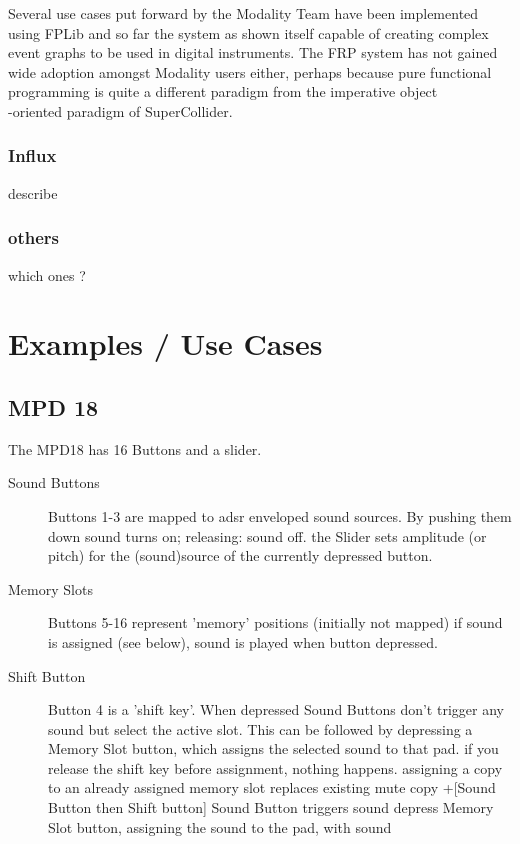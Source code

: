 \documentclass{article}
\begin{document}
Several use cases put forward by the Modality Team have been implemented using FPLib and so far the system as shown itself capable of creating complex event graphs to be used in digital instruments. The FRP system has not gained wide adoption amongst Modality users either, perhaps because pure functional programming is quite a different paradigm from the imperative object\\-oriented paradigm of SuperCollider.

\subsubsection{Influx}

describe

\subsubsection{others}

which ones ?

\section{Examples / Use Cases}
\label{sec:examples_use_cases}


\subsection{MPD 18}
\label{sub:mpd_18}

The MPD18 has 16 Buttons and a slider.

\begin{description}
 \item [Sound Buttons] Buttons 1-3 are mapped to adsr enveloped sound sources.
        By pushing them down sound turns on; releasing: sound off.
    the Slider sets amplitude (or pitch) for the (sound)source of the currently depressed button.
 \item [Memory Slots] Buttons 5-16 represent 'memory' positions (initially not mapped)
        if sound is assigned (see below), sound is played when button depressed.
 \item [Shift Button] Button 4 is a 'shift key'. When depressed
        Sound Buttons don't trigger any sound but select the active slot. This can be followed by
        depressing a Memory Slot button, which assigns the selected sound to that pad.
        if you release the shift key before assignment, nothing happens.
        assigning a copy to an already assigned memory slot replaces existing
        mute copy +[Sound Button then Shift button]
        Sound Button triggers sound
        depress Memory Slot button, assigning the sound to the pad, with sound
\end{description}
       
\end{document}
